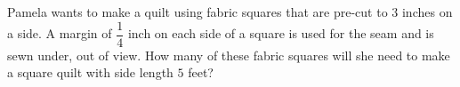 Pamela wants to make a quilt using fabric squares that are pre-cut to $3$ inches on a side. A margin of $\dfrac{1}{4}$ inch on each side of a square is used for the seam and is sewn under, out of view. How many of these fabric squares will she need to make a square quilt with side length $5$ feet?
